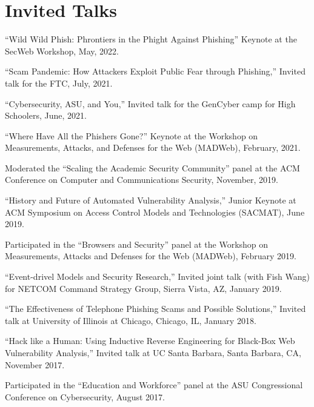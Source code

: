 \documentclass[11pt,letterpaper,sans]{moderncv}
\begin{document}
\section{Invited Talks}

\begin{etaremune}

\item ``Wild Wild Phish: Phrontiers in the Phight Against Phishing'' Keynote at the SecWeb Workshop, May, 2022.
  
\item ``Scam Pandemic: How Attackers Exploit Public Fear through Phishing,'' Invited talk for the FTC, July, 2021.

\item ``Cybersecurity, ASU, and You,'' Invited talk for the GenCyber camp for High Schoolers, June, 2021.

  \item ``Where Have All the Phishers Gone?'' Keynote at the Workshop on Measurements, Attacks, and Defenses for the Web (MADWeb), February, 2021.

  \item Moderated the ``Scaling the Academic Security Community'' panel at the ACM Conference on Computer and Communications Security, November, 2019.

  \item ``History and Future of Automated Vulnerability Analysis,'' Junior Keynote at ACM Symposium on Access Control Models and Technologies (SACMAT), June 2019.

  \item Participated in the ``Browsers and Security'' panel at the Workshop on Measurements, Attacks and Defenses for the Web (MADWeb), February 2019.

  \item ``Event-drivel Models and Security Research,'' Invited joint talk (with Fish Wang) for NETCOM Command Strategy Group, Sierra Vista, AZ, January 2019.

  \item ``The Effectiveness of Telephone Phishing Scams and Possible Solutions,''
    Invited talk at University of Illinois at Chicago, Chicago, IL, January 2018.

  \item ``Hack like a Human: Using Inductive Reverse Engineering for Black-Box Web Vulnerability Analysis,'' Invited talk at UC Santa Barbara, Santa Barbara, CA, November 2017.

  \item Participated in the ``Education and Workforce'' panel at the
    ASU Congressional Conference on Cybersecurity, August 2017.


\end{etaremune}
\end{document}
